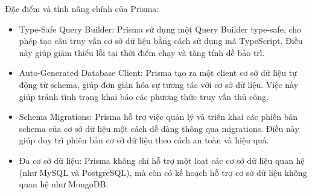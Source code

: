 \begin{enumerate}[a.]
Đặc điểm và tính năng chính của Prisma:
\begin{itemize}
\item Type-Safe Query Builder: Prisma sử dụng một Query Builder type-safe, cho phép tạo câu truy vấn cơ sở dữ liệu bằng cách sử dụng mã TypeScript. Điều này giúp giảm thiểu lỗi tại thời điểm chạy và tăng tính dễ bảo trì.
\item Auto-Generated Database Client: Prisma tạo ra một client cơ sở dữ liệu tự động từ schema, giúp đơn giản hóa sự tương tác với cơ sở dữ liệu. Việc này giúp tránh tình trạng khai báo các phương thức truy vấn thủ công.
\item Schema Migrations: Prisma hỗ trợ việc quản lý và triển khai các phiên bản schema của cơ sở dữ liệu một cách dễ dàng thông qua migrations. Điều này giúp duy trì phiên bản cơ sở dữ liệu theo cách an toàn và hiệu quả.
\item Đa cơ sở dữ liệu: Prisma không chỉ hỗ trợ một loạt các cơ sở dữ liệu quan hệ (như MySQL và PostgreSQL), mà còn có kế hoạch hỗ trợ cơ sở dữ liệu không quan hệ như MongoDB.


\end{itemize}
\end{enumerate}
